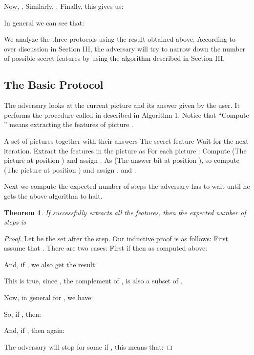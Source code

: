 \documentclass{llncs}
\begin{document}
Now, . Similarly, . Finally, this gives us:


In general we can see that: 


We analyze the three protocols using the result obtained above. According to over discussion in Section III, the adversary will try to narrow down the number of possible secret features by using the algorithm  described in Section III. 
 
\subsection{The Basic Protocol}
The adversary  looks at the current picture and its answer given by the user. It performs the procedure called  in described in Algorithm 1. Notice that ``Compute '' means extracting the features of picture .

\begin{algorithm}[h!]
\caption{}\label{alg:factorial}
\begin{algorithmic}[1]
\REQUIRE A set of pictures  together with their answers 
\ENSURE The secret feature 
\medskip
{}
	\STATE Wait for the next iteration.
\ELSE 
	\STATE Extract the features in the picture as 
	\REPEAT
		\STATE For each picture :
			 \STATE Compute  (The picture at position ) and assign .
		\ELSE
			 \STATE As  (The answer bit at position ), so compute  (The picture at position ) and assign . 
		\ENDIF
	\UNTIL  and .
\ENDIF
\end{algorithmic}
\end{algorithm}



Next we compute the expected number of steps the adversary has to wait until he gets the above algorithm to halt.

\newtheorem{theo2}{Theorem}
\begin{theo2}
If  successfully extracts all the features, then the expected number of steps is 
\end{theo2}

\begin{proof}
Let  be the set  after the  step. Our inductive proof is as follows:
First assume that . There are two cases: First if   then as computed above:

And, if , we also get the result:


This is true, since , the complement of , is also a subset of . 

Now, in general for , we have:

So, if , then:

And, if , then again:


The adversary will stop for some  if , this means that:

\end{proof}
\end{document}
